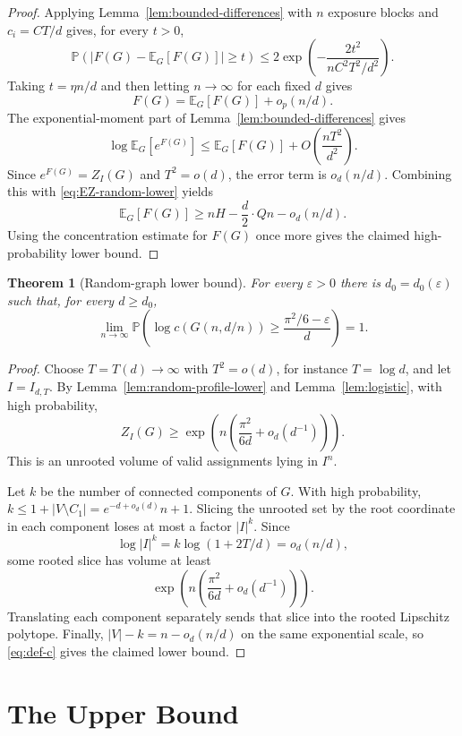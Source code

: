 \documentclass[11pt]{article}
\newtheorem{theorem}{Theorem}[section]
\theoremstyle{definition}
\newcommand{\PP}{\mathbb{P}}
\newcommand{\EE}{\mathbb{E}}
\newcommand{\eps}{\varepsilon}
\begin{document}
\begin{proof}
\bigskip
\noindent
Applying Lemma~\ref{lem:bounded-differences} with $n$ exposure blocks and $c_i=CT/d$ gives, for every $t>0$,
\[
  \PP\left(|F(G)-\EE_G \left[F(G)\right]|\ge t\right)
  \le 2\exp\left(-\frac{2t^2}{nC^2T^2/d^2}\right).
\]
Taking $t=\eta n/d$ and then letting $n\to\infty$ for each fixed $d$ gives
\[
  F(G)=\EE_G \left[F(G)\right]+o_p(n/d).
\]
The exponential-moment part of Lemma~\ref{lem:bounded-differences} gives
\[
  \log \EE_G \left[e^{F(G)}\right]
  \le
  \EE_G \left[F(G)\right]+O\left(\frac{nT^2}{d^2}\right).
\]
Since $e^{F(G)}=Z_I(G)$ and $T^2=o(d)$, the error term is $o_d(n/d)$.  Combining this with \eqref{eq:EZ-random-lower} yields
\[
  \EE_G \left[F(G)\right]
  \ge
  nH-\frac d2\cdot Qn-o_d(n/d).
\]
Using the concentration estimate for $F(G)$ once more gives the claimed high-probability lower bound.
\end{proof}

\begin{theorem}[Random-graph lower bound]\label{thm:lower}
For every $\eps>0$ there is $d_0=d_0(\eps)$ such that, for every $d\ge d_0$,
\[
  \lim_{n\to\infty}\PP\left(
  \log c(G(n,d/n))\ge\frac{\pi^2/6-\eps}{d}
  \right)=1.
\]
\end{theorem}

\begin{proof}
Choose \(T=T(d)\to\infty\) with \(T^2=o(d)\), for instance \(T=\log d\), and let \(I=I_{d,T}\).  By Lemma~\ref{lem:random-profile-lower} and Lemma~\ref{lem:logistic}, with high probability,
\[
  Z_I(G)\ge
  \exp\left(n\left(\frac{\pi^2}{6d}+o_d(d^{-1})\right)\right).
\]
This is an unrooted volume of valid assignments lying in \(I^n\).

\bigskip
\noindent
Let \(k\) be the number of connected components of \(G\).  With high probability, \(k\le 1+|V\setminus C_1|=e^{-d+o_d(d)}n+1\).  Slicing the unrooted set by the root coordinate in each component loses at most a factor \(|I|^k\).  Since
\[
  \log |I|^k
  =k\log(1+2T/d)=o_d(n/d),
\]
some rooted slice has volume at least
\[
  \exp\left(n\left(\frac{\pi^2}{6d}+o_d(d^{-1})\right)\right).
\]
Translating each component separately sends that slice into the rooted Lipschitz polytope.  Finally, \(|V|-k=n-o_d(n/d)\) on the same exponential scale, so \eqref{eq:def-c} gives the claimed lower bound.
\end{proof}

\section{The Upper Bound}
\end{document}
